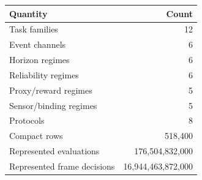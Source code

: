 \begin{tabular}{lr}
\toprule
Quantity & Count \\
\midrule
Task families & 12 \\
Event channels & 6 \\
Horizon regimes & 6 \\
Reliability regimes & 6 \\
Proxy/reward regimes & 5 \\
Sensor/binding regimes & 5 \\
Protocols & 8 \\
Compact rows & 518,400 \\
Represented evaluations & 176,504,832,000 \\
Represented frame decisions & 16,944,463,872,000 \\
\bottomrule
\end{tabular}
